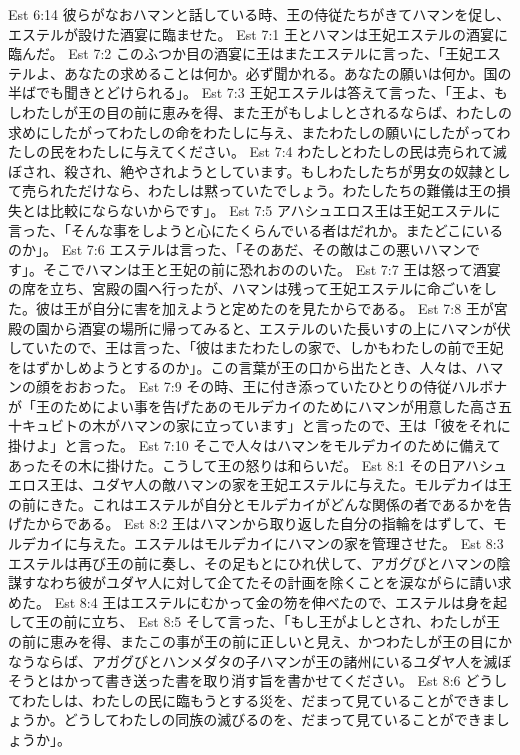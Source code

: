 Est 6:14  彼らがなおハマンと話している時、王の侍従たちがきてハマンを促し、エステルが設けた酒宴に臨ませた。
Est 7:1  王とハマンは王妃エステルの酒宴に臨んだ。
Est 7:2  このふつか目の酒宴に王はまたエステルに言った、「王妃エステルよ、あなたの求めることは何か。必ず聞かれる。あなたの願いは何か。国の半ばでも聞きとどけられる」。
Est 7:3  王妃エステルは答えて言った、「王よ、もしわたしが王の目の前に恵みを得、また王がもしよしとされるならば、わたしの求めにしたがってわたしの命をわたしに与え、またわたしの願いにしたがってわたしの民をわたしに与えてください。
Est 7:4  わたしとわたしの民は売られて滅ぼされ、殺され、絶やされようとしています。もしわたしたちが男女の奴隷として売られただけなら、わたしは黙っていたでしょう。わたしたちの難儀は王の損失とは比較にならないからです」。
Est 7:5  アハシュエロス王は王妃エステルに言った、「そんな事をしようと心にたくらんでいる者はだれか。またどこにいるのか」。
Est 7:6  エステルは言った、「そのあだ、その敵はこの悪いハマンです」。そこでハマンは王と王妃の前に恐れおののいた。
Est 7:7  王は怒って酒宴の席を立ち、宮殿の園へ行ったが、ハマンは残って王妃エステルに命ごいをした。彼は王が自分に害を加えようと定めたのを見たからである。
Est 7:8  王が宮殿の園から酒宴の場所に帰ってみると、エステルのいた長いすの上にハマンが伏していたので、王は言った、「彼はまたわたしの家で、しかもわたしの前で王妃をはずかしめようとするのか」。この言葉が王の口から出たとき、人々は、ハマンの顔をおおった。
Est 7:9  その時、王に付き添っていたひとりの侍従ハルボナが「王のためによい事を告げたあのモルデカイのためにハマンが用意した高さ五十キュビトの木がハマンの家に立っています」と言ったので、王は「彼をそれに掛けよ」と言った。
Est 7:10  そこで人々はハマンをモルデカイのために備えてあったその木に掛けた。こうして王の怒りは和らいだ。
Est 8:1  その日アハシュエロス王は、ユダヤ人の敵ハマンの家を王妃エステルに与えた。モルデカイは王の前にきた。これはエステルが自分とモルデカイがどんな関係の者であるかを告げたからである。
Est 8:2  王はハマンから取り返した自分の指輪をはずして、モルデカイに与えた。エステルはモルデカイにハマンの家を管理させた。
Est 8:3  エステルは再び王の前に奏し、その足もとにひれ伏して、アガグびとハマンの陰謀すなわち彼がユダヤ人に対して企てたその計画を除くことを涙ながらに請い求めた。
Est 8:4  王はエステルにむかって金の笏を伸べたので、エステルは身を起して王の前に立ち、
Est 8:5  そして言った、「もし王がよしとされ、わたしが王の前に恵みを得、またこの事が王の前に正しいと見え、かつわたしが王の目にかなうならば、アガグびとハンメダタの子ハマンが王の諸州にいるユダヤ人を滅ぼそうとはかって書き送った書を取り消す旨を書かせてください。
Est 8:6  どうしてわたしは、わたしの民に臨もうとする災を、だまって見ていることができましょうか。どうしてわたしの同族の滅びるのを、だまって見ていることができましょうか」。

